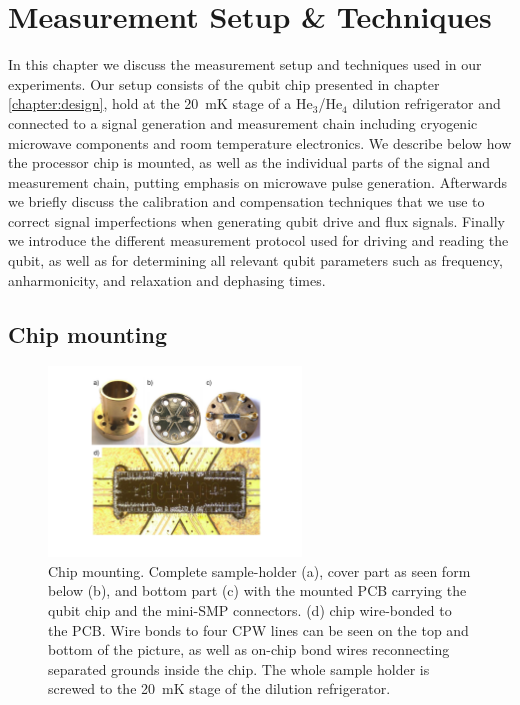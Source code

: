 \chapter{Measurement Setup \& Techniques} \label{chapter:measurement}

In this chapter we discuss the measurement setup and techniques used in our experiments. Our setup consists of the qubit chip presented in chapter \ref{chapter:design}, hold at the 20~mK stage of a He$_3$/He$_4$ dilution refrigerator and connected to a signal generation and measurement chain including cryogenic microwave components and room temperature electronics. We describe below how the processor chip is mounted, as well as the individual parts of the signal  and measurement chain, putting emphasis on microwave pulse generation. Afterwards we briefly discuss the calibration and compensation techniques that we use to correct signal imperfections when generating qubit drive and flux signals. Finally we introduce the different measurement protocol used for driving and reading the qubit, as well as for determining all relevant qubit parameters such as frequency, anharmonicity, and relaxation and dephasing times.

\smallskip

\section{Chip mounting}

\begin{figure}
	\centering
		\includegraphics[width=0.6\textwidth]{"./material/photos/sample holder/sample_holder"}
	\caption[]{Chip mounting. Complete sample-holder (a), cover part as seen form below (b), and bottom part (c) with the mounted PCB carrying the qubit chip and the mini-SMP connectors. (d)  chip  wire-bonded to the PCB. Wire bonds to four CPW lines can be seen on the top and bottom of the picture, as well as on-chip bond wires reconnecting separated grounds inside the chip. The whole sample holder is screwed to the 20~mK stage of the dilution refrigerator.}
	\label{fig:pcb_and_sample_holder}
\end{figure}

